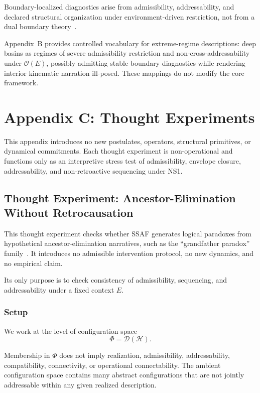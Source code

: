 \documentclass[aps,prx,onecolumn,11pt]{revtex4-2}
\theoremstyle{plain}
\theoremstyle{definition}
\theoremstyle{remark}
\begin{document}
Boundary-localized diagnostics arise from admissibility, addressability,
and declared structural organization under environment-driven
restriction, not from a dual boundary theory~\cite{Susskind1995,
Maldacena1998}.

Appendix~B provides controlled vocabulary for extreme-regime
descriptions: deep basins as regimes of severe admissibility restriction
and non-cross-addressability under \(\mathcal O(E)\), possibly admitting
stable boundary diagnostics while rendering interior kinematic narration
ill-posed. These mappings do not modify the core framework.

\section{Appendix C: Thought Experiments}
\label{app:thought_experiments}

This appendix introduces no new postulates, operators, structural
primitives, or dynamical commitments. Each thought experiment is
non-operational and functions only as an interpretive stress test of
admissibility, envelope closure, addressability, and non-retroactive
sequencing under NS1.

\subsection{Thought Experiment: Ancestor-Elimination Without Retrocausation}
\label{appC:toy_ancestor_elimination}

This thought experiment checks whether SSAF generates logical paradoxes
from hypothetical ancestor-elimination narratives, such as the
``grandfather paradox'' family~\cite{Lewis1976}. It introduces no
admissible intervention protocol, no new dynamics, and no empirical
claim.

Its only purpose is to check consistency of admissibility, sequencing,
and addressability under a fixed context \(E\).

\subsubsection{Setup}

We work at the level of configuration space
\[
\Phi=\mathcal D(\mathcal H).
\]

Membership in \(\Phi\) does not imply realization, admissibility,
addressability, compatibility, connectivity, or operational
connectability. The ambient configuration space contains many abstract
configurations that are not jointly addressable within any given
realized description.
\end{document}
